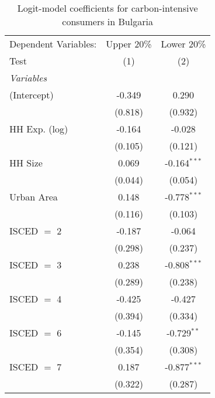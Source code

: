 
\begin{table}[htbp!]
   \centering
   \small
   \begin{adjustbox}{width = 1\textwidth, max height = 0.95\textheight, center}
      \begin{threeparttable}[b]
         \caption{\label{tab:Logit_1_BGR} Logit-model coefficients for carbon-intensive consumers in Bulgaria}
         \begin{tabular}{lcc}
            \tabularnewline \midrule \midrule
            Dependent Variables: & Upper 20\%  & Lower 20\%\\   
            Test                 & (1)         & (2)\\  
            \midrule
            \emph{Variables}\\
            (Intercept)          & -0.349      & 0.290\\   
                                 & (0.818)     & (0.932)\\   
            HH Exp. (log)        & -0.164      & -0.028\\   
                                 & (0.105)     & (0.121)\\   
            HH Size              & 0.069       & -0.164$^{***}$\\   
                                 & (0.044)     & (0.054)\\   
            Urban Area           & 0.148       & -0.778$^{***}$\\   
                                 & (0.116)     & (0.103)\\   
            ISCED $=$ 2          & -0.187      & -0.064\\   
                                 & (0.298)     & (0.237)\\   
            ISCED $=$ 3          & 0.238       & -0.808$^{***}$\\   
                                 & (0.289)     & (0.238)\\   
            ISCED $=$ 4          & -0.425      & -0.427\\   
                                 & (0.394)     & (0.334)\\   
            ISCED $=$ 6          & -0.145      & -0.729$^{**}$\\   
                                 & (0.354)     & (0.308)\\   
            ISCED $=$ 7          & 0.187       & -0.877$^{***}$\\   
                                 & (0.322)     & (0.287)\\   

\end{tabular}
\end{threeparttable}
\end{adjustbox}
\end{table}
